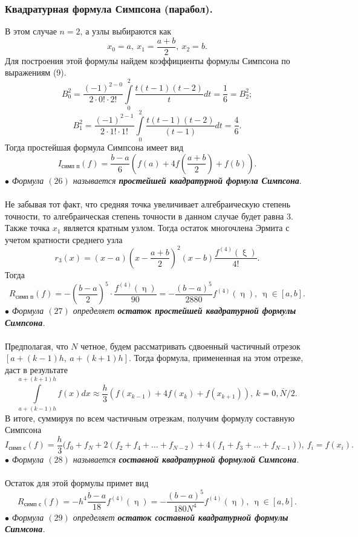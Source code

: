 \documentclass[a4paper, 12pt]{report}
\numberwithin{equation}{section}
\renewcommand{\eta}{\upeta}
\renewcommand{\xi}{\upxi}
\begin{document}
	 \subsubsection{Квадратурная формула Симпсона (парабол).}
	 В этом случае $n=2$, а узлы выбираются как $$x_0 = a,\ x_1 = \dfrac{a+b}{2},\ x_2 = b.$$
	 Для построения этой формулы найдем коэффициенты формулы Симпсона по выражениям (9).
	 $$B_0^2 = \dfrac{(-1)^{2-0}}{2\cdot 0!\cdot 2!}\int\limits_0^2\dfrac{t(t-1)(t-2)}{t}dt = \dfrac16 = B_2^2;$$
	 $$B_1^2 = \dfrac{(-1)^{2-1}}{2\cdot 1!\cdot 1!}\int\limits_0^2\dfrac{t(t-1)(t-2)}{(t-1)}dt =\dfrac46.$$
	 Тогда простейшая формула Симпсона имеет вид \begin{equation}
	 	I_\text{симп п}(f) = \dfrac{b-a}{6}\left(f(a) + 4f\left(\dfrac{a+b}{2}\right) + f(b)\right).
	 \end{equation}
	 $\bullet$ \textit{Формула $(26)$ называется \textbf{простейшей квадратурной формула Симпсона}}.\\\\
	 Не забывая тот факт, что средняя точка увеличивает алгебраическую степень точности, то алгебраическая степень точности в данном случае будет равна 3. Также точка $x_1$ является кратным узлом. Тогда остаток многочлена Эрмита с учетом кратности среднего узла $$r_3(x) = (x-a)\left(x-\dfrac{a+b}{2}\right)^2(x-b)\dfrac{f^{(4)}(\xi)}{4!}.$$
	 Тогда 
	 \begin{equation}
	 	R_\text{симп п}(f) = -\left(\dfrac{b-a}{2}\right)^5\cdot \dfrac{f^{(4)}(\eta)}{90} = -\dfrac{(b-a)^5}{2880}f^{(4)}(\eta),\ \eta\in [a,b].
	 \end{equation}
	 $\bullet$ \textit{Формула $(27)$ определяет \textbf{остаток простейшей квадратурной формулы Симпсона}.}\\\\
	 Предполагая, что $N$ четное, будем рассматривать сдвоенный частичный отрезок $[a+(k-1)h,\ a+(k+1)h].$ Тогда формула, примененная на этом отрезке, даст в результате $$\int\limits_{a+(k-1)h}^{a+(k+1)h}f(x)dx\approx \dfrac h3(f(x_{k-1}) + 4f(x_k) + f(x_{k+1})),\ k=\overline{0, N/2}.$$
	 В итоге, суммируя по всем частичным отрезкам, получим формулу составную Симпсона 
	 \begin{equation}
	 	I_\text{симп с}(f) = \dfrac{h}{3}\big(f_0 + f_N + 2(f_2 + f_4 + \ldots + f_{N-2}) + 4(f_1 + f_3 + \ldots + f_{N-1})\big),\ f_i = f(x_i).
	 \end{equation}
	 $\bullet$ \textit{Формула $(28)$ называется \textbf{составной квадратурной формулой Симпсона}.}\\\\
	 Остаток для этой формулы примет вид 
	 \begin{equation}
	 	R_\text{симп с}(f) = -h^4\dfrac{b-a}{18}f^{(4)}(\eta) = -\dfrac{(b-a)^5}{180N^4}f^{(4)}(\eta),\ \eta\in [a,b].
	 \end{equation}
	$\bullet$ \textit{Формула $(29)$ определяет \textbf{остаток составной квадратурной формулы Сипмсона}.}
\end{document}
